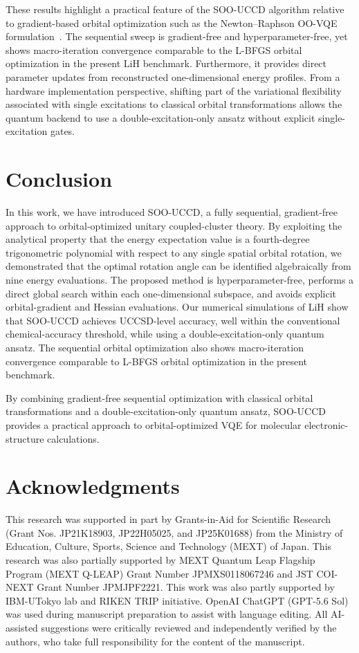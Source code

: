 \documentclass[
 reprint,
 amsmath,amssymb,
 aps,
 physrev,
]{revtex4-2}
\begin{document}
These results highlight a practical feature of the SOO-UCCD algorithm relative to gradient-based orbital optimization such as the Newton--Raphson OO-VQE formulation~\cite{mizukami2020}. The sequential sweep is gradient-free and hyperparameter-free, yet shows macro-iteration convergence comparable to the L-BFGS orbital optimization in the present LiH benchmark.
%
Furthermore, it provides direct parameter updates from reconstructed one-dimensional energy profiles. From a hardware implementation perspective, shifting part of the variational flexibility associated with single excitations to classical orbital transformations allows the quantum backend to use a double-excitation-only ansatz without explicit single-excitation gates.
%
%
\section{Conclusion}
\label{sec:conclusion}
%
In this work, we have introduced SOO-UCCD, a fully sequential, gradient-free approach to orbital-optimized unitary coupled-cluster theory. By exploiting the analytical property that the energy expectation value is a fourth-degree trigonometric polynomial with respect to any single spatial orbital rotation, we demonstrated that the optimal rotation angle can be identified algebraically from nine energy evaluations. The proposed method is hyperparameter-free, performs a direct global search within each one-dimensional subspace, and avoids explicit orbital-gradient and Hessian evaluations.
%
Our numerical simulations of LiH show that SOO-UCCD achieves UCCSD-level accuracy, well within the conventional chemical-accuracy threshold, while using a double-excitation-only quantum ansatz. The sequential orbital optimization also shows macro-iteration convergence comparable to L-BFGS orbital optimization in the present benchmark.

By combining gradient-free sequential optimization with classical orbital transformations and a double-excitation-only quantum ansatz, SOO-UCCD provides a practical approach to orbital-optimized VQE for molecular electronic-structure calculations.

\section*{Acknowledgments}
This research was supported in part by Grants-in-Aid for Scientific Research
(Grant Nos. JP21K18903, JP22H05025, and JP25K01688) from the Ministry
of Education, Culture, Sports, Science and Technology (MEXT) of Japan.
This research was also partially supported by MEXT Quantum Leap
Flagship Program (MEXT Q-LEAP) Grant Number JPMXS0118067246
and JST COI-NEXT Grant Number JPMJPF2221. This work was also partly supported by IBM-UTokyo lab and RIKEN TRIP initiative.
OpenAI ChatGPT (GPT-5.6 Sol) was used during manuscript preparation
to assist with language editing. All AI-assisted suggestions were critically reviewed and independently
verified by the authors, who take full responsibility for the content of the manuscript.
\end{document}
